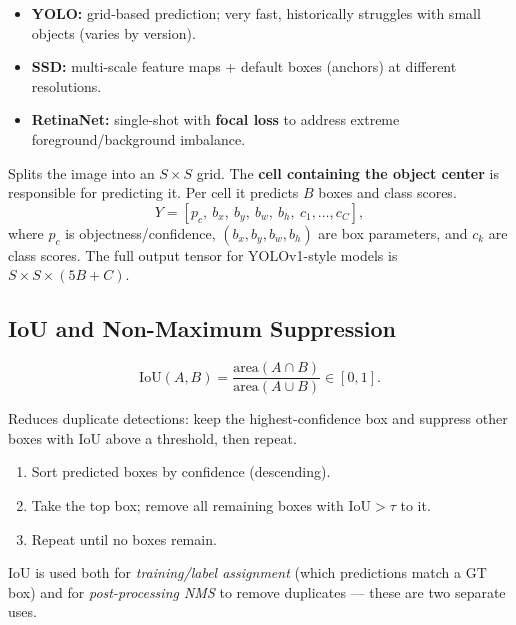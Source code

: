 \documentclass[11pt, oneside]{book}
\begin{document}
\begin{thmbox}[title={Reprojection Error Minimization}]
\begin{defbox}[title={Correlation and Convolution}]
\begin{defbox}[title={ReLU and Pooling}]
\begin{defbox}[title={Segmentation}]
\begin{defbox}[title={Graph-Based Segmentation}]
\begin{defbox}[title={U-Net}]
\begin{itemize}
  \item \textbf{YOLO:} grid-based prediction; very fast, historically struggles with small objects (varies by version).
  \item \textbf{SSD:} multi-scale feature maps + default boxes (anchors) at different resolutions.
  \item \textbf{RetinaNet:} single-shot with \textbf{focal loss} to address extreme foreground/background imbalance.
\end{itemize}

\begin{defbox}[title={YOLO}]
Splits the image into an $S\times S$ grid. The \textbf{cell containing the object center} is responsible for predicting it.
Per cell it predicts $B$ boxes and class scores.
\[
Y = [p_c,\ b_x,\ b_y,\ b_w,\ b_h,\ c_1,\dots,c_C],
\]
where $p_c$ is objectness/confidence, $(b_x,b_y,b_w,b_h)$ are box parameters, and $c_k$ are class scores.
The full output tensor for YOLOv1-style models is $S\times S\times (5B + C)$.
\end{defbox}

\subsection{IoU and Non-Maximum Suppression}

\begin{thmbox}[title={Intersection over Union}]
\[
\mathrm{IoU}(A,B)=\frac{\mathrm{area}(A\cap B)}{\mathrm{area}(A\cup B)}\in[0,1].
\]
\end{thmbox}

\begin{defbox}[title={Non-Maximum Suppression (NMS)}]
Reduces duplicate detections: keep the highest-confidence box and suppress other boxes with IoU above a threshold, then repeat.
\begin{enumerate}
  \item Sort predicted boxes by confidence (descending).
  \item Take the top box; remove all remaining boxes with $\mathrm{IoU}>\tau$ to it.
  \item Repeat until no boxes remain.
\end{enumerate}
\end{defbox}

IoU is used both for \emph{training/label assignment} (which predictions match a GT box) and for
\emph{post-processing NMS} to remove duplicates --- these are two separate uses.


\end{defbox}
\end{defbox}
\end{defbox}
\end{defbox}
\end{defbox}
\end{thmbox}
\end{document}
